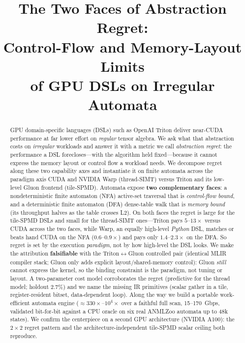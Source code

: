 \documentclass[conference]{IEEEtran}
\begin{document}
\title{The Two Faces of Abstraction Regret:\\
Control-Flow and Memory-Layout Limits\\
of GPU DSLs on Irregular Automata}

\author{
}

\maketitle

\begin{abstract}
GPU domain-specific languages (DSLs) such as OpenAI Triton deliver near-CUDA performance
at far lower effort on \emph{regular} tensor algebra. We ask what that abstraction costs on
\emph{irregular} workloads and answer it with a metric we call \emph{abstraction regret}:
the performance a DSL forecloses---with the algorithm held fixed---because it cannot express
the memory layout or control flow a workload needs. We decompose regret along these two
capability axes and instantiate it on finite automata across the paradigm axis CUDA and
NVIDIA Warp (thread-SIMT) versus Triton and its low-level Gluon frontend (tile-SPMD).
Automata expose \textbf{two complementary faces}: a nondeterministic finite automaton
(NFA) active-set traversal that is \emph{control-flow bound}, and a deterministic finite
automaton (DFA) dense-table walk that is \emph{memory bound} (its
throughput halves as the table crosses L2). On both faces the regret is large for the
tile-SPMD DSLs and small for the thread-SIMT ones---Triton pays $5$--$13\times$ versus CUDA
across the two faces, while Warp, an equally high-level \emph{Python} DSL, matches or beats
hand CUDA on the NFA ($0.6$--$0.9\times$) and pays only $1.4$--$2.3\times$ on the DFA. So
regret is set by the execution \emph{paradigm}, not by how
high-level the DSL looks. We make the attribution \textbf{falsifiable} with the
Triton$\leftrightarrow$Gluon controlled pair (identical MLIR compiler stack; Gluon only adds
explicit layout/shared-memory control): Gluon \emph{still} cannot express the kernel, so the
binding constraint is the paradigm, not tuning or layout. A two-parameter cost model
corroborates the regret (predictive for the thread model; holdout 2.7\%) and we name the
missing IR primitives (scalar gather in a tile, register-resident
bitset, data-dependent loop). Along the way we build a portable work-efficient automata engine
($\approx\!330\times$--$10^4\times$ over a faithful full scan, 15--170~Gbps, validated bit-for-bit
against a CPU oracle on six real ANMLZoo automata up to 48k states). We confirm the centerpiece
on a second GPU architecture (NVIDIA A100): the $2\times2$ regret pattern and the
architecture-independent tile-SPMD scalar ceiling both reproduce.
\end{abstract}
\end{document}

